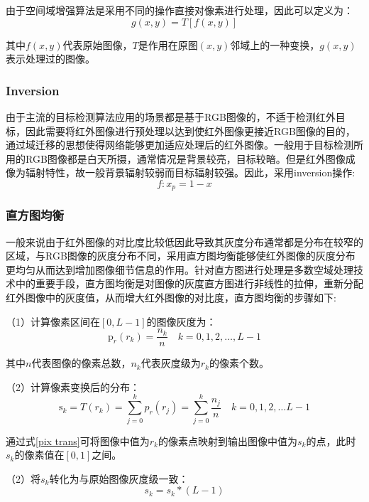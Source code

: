由于空间域增强算法是采用不同的操作直接对像素进行处理，因此可以定义为：
\begin{equation}
  g(x, y)=T[f(x, y)]
\end{equation}

其中$f(x, y)$代表原始图像，$T$是作用在原图$(x, y)$邻域上的一种变换，$g(x, y)$表示处理过的图像。

\subsubsection{Inversion}
由于主流的目标检测算法应用的场景都是基于RGB图像的，不适于检测红外目标，因此需要将红外图像进行预处理以达到使红外图像更接近RGB图像的目的，通过域迁移的思想使得网络能够更加适应处理后的红外图像。一般用于目标检测所用的RGB图像都是白天所摄，通常情况是背景较亮，目标较暗。但是红外图像成像为辐射特性，故一般背景辐射较弱而目标辐射较强。因此，采用inversion操作:
\begin{equation}
  f: x_{p}=1-x
\end{equation}

\subsubsection{直方图均衡}
一般来说由于红外图像的对比度比较低因此导致其灰度分布通常都是分布在较窄的区域，与RGB图像的灰度分布不同，采用直方图均衡能够使红外图像的灰度分布更均匀从而达到增加图像细节信息的作用。针对直方图进行处理是多数空域处理技术中的重要手段，直方图均衡是对图像的灰度直方图进行非线性的拉伸，重新分配红外图像中的灰度值，从而增大红外图像的对比度，直方图均衡的步骤如下: 

（1）计算像素区间在$[0,L-1]$的图像灰度为：
\begin{equation}
  \mathrm{p}_{r}\left(r_{k}\right)=\frac{n_{k}}{n} \quad k=0,1,2, \ldots, L-1
\end{equation}

其中$n$代表图像的像素总数，$n_{k}$代表灰度级为$r_{k}$的像素个数。

（2）计算像素变换后的分布：
\begin{equation}
  \mathrm{s}_{k}=T\left(r_{k}\right)=\sum_{j=0}^{k} p_{r}\left(r_{j}\right)=\sum_{j=0}^{k} \frac{n_{j}}{n} \quad k=0,1,2, \ldots L-1
  \label{pix trans}
\end{equation}

通过式\ref{pix trans}可将图像中值为$r_{k}$的像素点映射到输出图像中值为$s_{k}$的点，此时$s_{k}$的像素值在$[0,1]$之间。

（2）将$s_{k}$转化为与原始图像灰度级一致：
\begin{equation}
  s_{k}=s_{k} *(L-1)
\end{equation}

